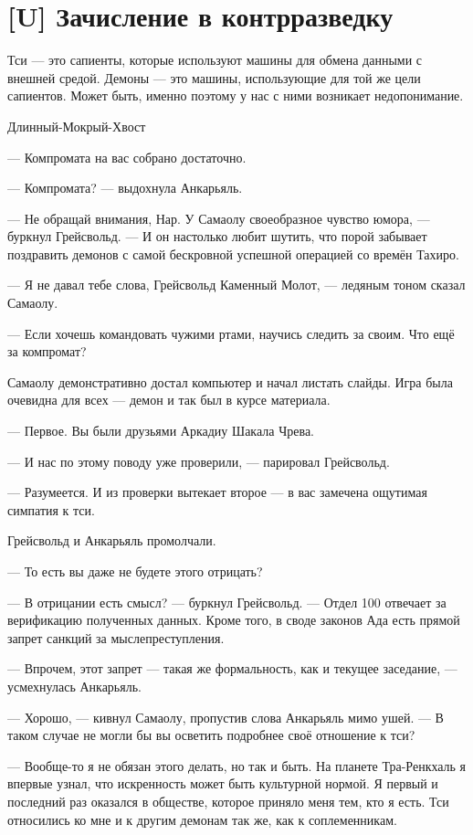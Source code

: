 \section{[U] Зачисление в контрразведку}

\epigraph
{Тси --- это сапиенты, которые используют машины для обмена данными с внешней средой.
Демоны --- это машины, использующие для той же цели сапиентов.
Может быть, именно поэтому у нас с ними возникает недопонимание.}
{Длинный-Мокрый-Хвост}

\textspace

--- Компромата на вас собрано достаточно.

--- Компромата? --- выдохнула Анкарьяль.

--- Не обращай внимания, Нар.
У Самаолу своеобразное чувство юмора, --- буркнул Грейсвольд.
--- И он настолько любит шутить, что порой забывает поздравить демонов с самой бескровной успешной операцией со времён Тахиро.

--- Я не давал тебе слова, Грейсвольд Каменный Молот, --- ледяным тоном сказал Самаолу.

--- Если хочешь командовать чужими ртами, научись следить за своим.
Что ещё за компромат?

Самаолу демонстративно достал компьютер и начал листать слайды.
Игра была очевидна для всех --- демон и так был в курсе материала.

--- Первое.
Вы были друзьями Аркадиу Шакала Чрева.

--- И нас по этому поводу уже проверили, --- парировал Грейсвольд.

--- Разумеется.
И из проверки вытекает второе --- в вас замечена ощутимая симпатия к тси.

Грейсвольд и Анкарьяль промолчали.

--- То есть вы даже не будете этого отрицать?

--- В отрицании есть смысл? --- буркнул Грейсвольд.
--- Отдел 100 отвечает за верификацию полученных данных.
Кроме того, в своде законов Ада есть прямой запрет санкций за мыслепреступления.

--- Впрочем, этот запрет --- такая же формальность, как и текущее заседание, --- усмехнулась Анкарьяль.

--- Хорошо, --- кивнул Самаолу, пропустив слова Анкарьяль мимо ушей.
--- В таком случае не могли бы вы осветить подробнее своё отношение к тси?

--- Вообще-то я не обязан этого делать, но так и быть.
На планете Тра-Ренкхаль я впервые узнал, что искренность может быть культурной нормой.
Я первый и последний раз оказался в обществе, которое приняло меня тем, кто я есть.
Тси относились ко мне и к другим демонам так же, как к соплеменникам.

